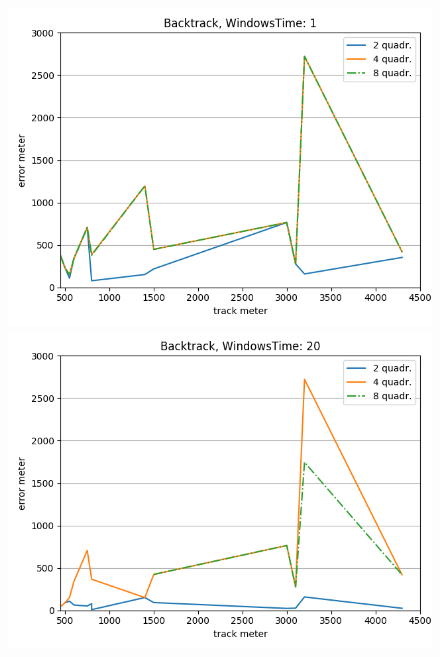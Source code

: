 \documentclass[12pt,a4paper,openright,twoside]{report}
\begin{document}
\begin{figure}[H]
\centering 
\includegraphics[scale=0.4]{thirdChartBacktrack-1} 
\includegraphics[scale=0.4]{thirdChartBacktrack-20} 
\end{figure}
\end{document}
